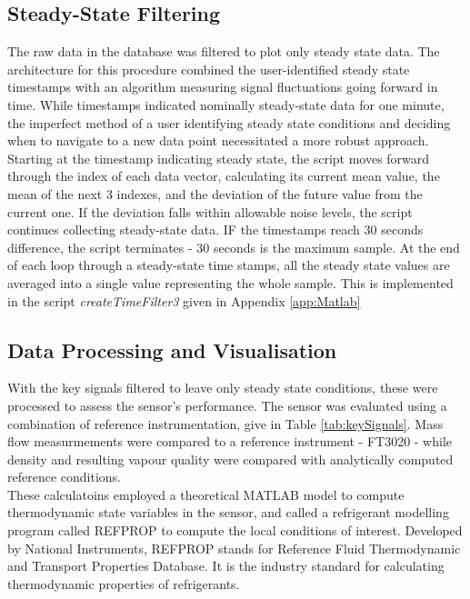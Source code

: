 \documentclass{report}
\begin{document}
\subsection{Steady-State Filtering}
The raw data in the database was filtered to plot only steady state data. The architecture for this procedure combined the user-identified steady state timestamps with an algorithm measuring signal fluctuations going forward in time. While timestamps indicated nominally steady-state data for one minute, the imperfect method of a user identifying steady state conditions and deciding when to navigate to a new data point necessitated a more robust approach. \\Starting at the timestamp indicating steady state, the script moves forward through the index of each data vector, calculating its current mean value, the mean of the next 3 indexes, and the deviation of the future value from the current one. If the deviation falls within allowable noise levels, the script continues collecting steady-state data. IF the timestamps reach 30 seconds difference, the script terminates - 30 seconds is the maximum sample. At the end of each loop through a steady-state time stamps, all the steady state values are averaged into a single value representing the whole sample. This is implemented in the script \textit{createTimeFilter3} given in Appendix \ref{app:Matlab} 
\subsection{Data Processing and Visualisation}
With the key signals filtered to leave only steady state conditions, these were processed to assess the sensor's performance. The sensor was evaluated using a combination of reference instrumentation, give in Table \ref{tab:keySignals}. Mass flow measurmements were compared to a reference instrument - FT3020 - while density and resulting vapour quality were compared with analytically computed reference conditions.\\
These calculatoins employed a theoretical MATLAB model to compute thermodynamic state variables in the sensor, and called a refrigerant modelling program called REFPROP to compute the local conditions of interest. 
Developed by National Instruments, REFPROP stands for Reference Fluid Thermodynamic and Transport Properties Database. It is the industry standard for calculating thermodynamic properties of refrigerants. \cite{REFPROP}
\end{document}
